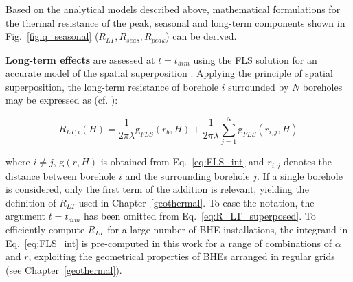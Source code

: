 Based on the analytical models described above, mathematical formulations for the thermal resistance of the peak, seasonal and long-term components shown in Fig.~\ref{fig:q_seasonal} ($R_{LT},R_{seas},R_{peak}$) can be derived. 

\textbf{Long-term effects} are assessed at $t = t_\mathit{dim}$ using the FLS solution for an accurate model of the spatial superposition \cite{miglani_methodology_2018,rivera_increased_2017}.
%
Applying the principle of spatial superposition, 
the long-term resistance of borehole $i$ surrounded by $N$ boreholes may be expressed as (cf. \cite{claesson_analytical_2011}):

\begin{equation}
\label{eq:R_LT_superposed}
    R_{LT, i}(H) = \frac{1}{2 \pi \lambda} \mathrm{g}_{FLS}(r_b, H) + \frac{1}{2 \pi \lambda} \sum_{j=1}^N \mathrm{g}_{FLS}(r_{i,j}, H) 
\end{equation}

where $i \neq j$, $\mathrm{g}(r, H)$ is obtained from Eq.~\ref{eq:FLS_int} and $r_{i,j}$ denotes the distance between borehole $i$ and the surrounding borehole $j$. If a single borehole is considered, only the first term of the addition is relevant, yielding the definition of $R_{LT}$ used in Chapter~\ref{geothermal}. To ease the notation, the argument $t = t_\mathit{dim}$ has been omitted from Eq.~\ref{eq:R_LT_superposed}.
To efficiently compute $R_{LT}$ for a large number of BHE installations, the integrand in Eq.~\ref{eq:FLS_int} is pre-computed in this work for a range of combinations of $\alpha$ and $r$, exploiting the geometrical properties of BHEs arranged in regular grids (see Chapter~\ref{geothermal}).

